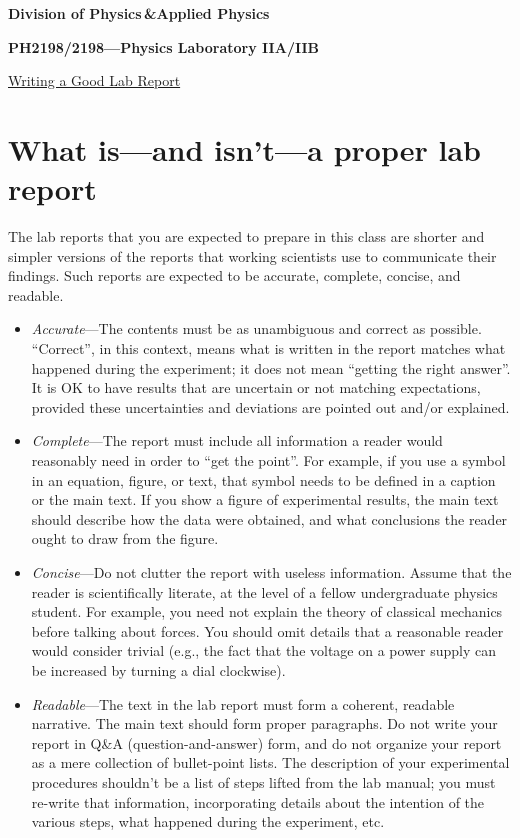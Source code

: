 \documentclass[11pt,a4paper]{article}
\begin{document}
\begin{center}
\textbf{Division of Physics\;\,\&\;Applied Physics}

\textbf{PH2198/2198---Physics Laboratory IIA/IIB}

\vskip 0.05in

\underline{\Huge Writing a Good Lab Report}
\end{center}

\section{What is---and isn't---a proper lab report}

The lab reports that you are expected to prepare in this class are
shorter and simpler versions of the reports that working scientists
use to communicate their findings.  Such reports are expected to be
accurate, complete, concise, and readable.

\begin{itemize}
\item \textit{Accurate}---The contents must be as unambiguous and
  correct as possible.  ``Correct'', in this context, means what is
  written in the report matches what happened during the experiment;
  it does not mean ``getting the right answer''.  It is OK to have
  results that are uncertain or not matching expectations, provided
  these uncertainties and deviations are pointed out and/or explained.

\item \textit{Complete}---The report must include all information a
  reader would reasonably need in order to ``get the point''.  For
  example, if you use a symbol in an equation, figure, or text, that
  symbol needs to be defined in a caption or the main text.  If you
  show a figure of experimental results, the main text should describe
  how the data were obtained, and what conclusions the reader ought to
  draw from the figure.

\item \textit{Concise}---Do not clutter the report with useless
  information.  Assume that the reader is scientifically literate, at
  the level of a fellow undergraduate physics student.  For example,
  you need not explain the theory of classical mechanics before
  talking about forces.  You should omit details that a reasonable
  reader would consider trivial (e.g., the fact that the voltage on a
  power supply can be increased by turning a dial clockwise).

\item \textit{Readable}---The text in the lab report must form a
  coherent, readable narrative.  The main text should form proper
  paragraphs.  Do not write your report in Q\&A (question-and-answer)
  form, and do not organize your report as a mere collection of
  bullet-point lists.  The description of your experimental procedures
  shouldn't be a list of steps lifted from the lab manual; you must
  re-write that information, incorporating details about the intention
  of the various steps, what happened during the experiment, etc.
\end{itemize}
\end{document}
